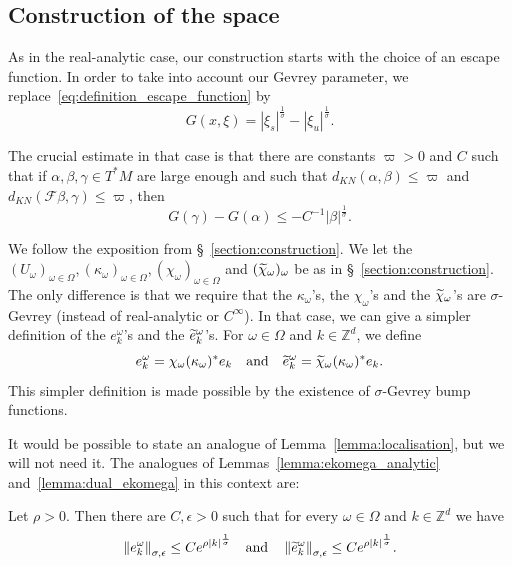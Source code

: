 \documentclass[AHL,Unicode,longabstracts,published]{cedram}
\newcommand{\n}[1]{\left\|#1\right\|}
\newcommand{\va}[1]{\left|#1\right|}
\newcommand{\clF}{\mathcal{F}}
\newcommand{\bbZ}{\mathbb{Z}}
\let\oldtilde\tilde
\renewcommand*{\tilde}[1]{\mathchoice{\widetilde{#1}}{\widetilde{#1}}{\oldtilde{#1}}{\oldtilde{#1}}}
\begin{document}
\subsection{Construction of the space}

As in the real-analytic case, our construction starts with the choice of an escape function. In order to take into account our Gevrey parameter, we replace~\eqref{eq:definition_escape_function} by
\begin{equation*}
G(x,\xi) = \va{\xi_s}^{\frac{1}{\sigma}} - \va{\xi_u}^{\frac{1}{\sigma}}.
\end{equation*}

The crucial estimate in that case is that there are constants $ \varpi > 0$ and $C$ such that if $\alpha,\beta,\gamma \in T^* M$ are large enough and such that $d_{KN}(\alpha,\beta) \leq \varpi$ and $d_{KN}(\clF \beta,\gamma) \leq \varpi$, then
\begin{equation*}
G(\gamma) - G(\alpha) \leq - C^{-1} \va{\beta}^{\frac{1}{\sigma}}.
\end{equation*}

We follow the exposition from \S~\ref{section:construction}. We let the $(U_\omega)_{\omega \in \Omega}, (\kappa_\omega)_{\omega \in \Omega}, (\chi_\omega)_{\omega \in \Omega}$ and $(\tilde{\chi}_\omega)_{\omega}$ be as in \S~\ref{section:construction}. The only difference is that we require that the $\kappa_\omega$'s, the $\chi_\omega$'s and the $\tilde{\chi}_\omega$'s are $\sigma$-Gevrey (instead of real-analytic or $C^\infty$). In that case, we can give a simpler definition of the $e_k^\omega$'s and the $\tilde{e}_k^\omega$'s. For $\omega \in \Omega$ and $k \in \bbZ^d$, we define
\begin{equation*}
e_k^\omega = \chi_\omega (\kappa_\omega)^* e_k \quad \text{and} \quad \tilde{e}_k^\omega = \tilde{\chi}_\omega (\kappa_\omega)^* e_k.
\end{equation*}
This simpler definition is made possible by the existence of $\sigma$-Gevrey bump functions.

It would be possible to state an analogue of Lemma~\ref{lemma:localisation}, but we will not need it. The analogues of Lemmas~\ref{lemma:ekomega_analytic} and~\ref{lemma:dual_ekomega} in this context are:

\begin{lemm}\label{lemma:ekomega_gevrey}
Let $\rho > 0$. Then there are $C,\epsilon > 0$ such that for every $\omega \in \Omega$ and $k \in \bbZ^d$ we have
\begin{equation*}
\n{e_k^\omega}_{\sigma,\epsilon} \leq C e^{\rho \va{k}^{\frac{1}{\sigma}}} \quad \text{and}\quad \n{\tilde{e}_k^\omega}_{\sigma,\epsilon} \leq C e^{\rho \va{k}^{\frac{1}{\sigma}}}.
\end{equation*}
\end{lemm}
\end{document}
